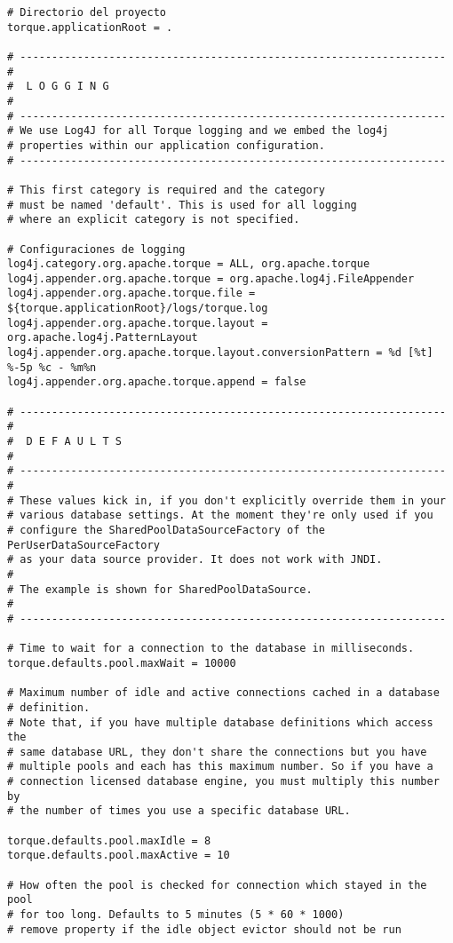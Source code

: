 \begin{lstlisting}
# Directorio del proyecto
torque.applicationRoot = .

# -------------------------------------------------------------------
#
#  L O G G I N G
#
# -------------------------------------------------------------------
# We use Log4J for all Torque logging and we embed the log4j
# properties within our application configuration.
# -------------------------------------------------------------------

# This first category is required and the category
# must be named 'default'. This is used for all logging
# where an explicit category is not specified.

# Configuraciones de logging
log4j.category.org.apache.torque = ALL, org.apache.torque
log4j.appender.org.apache.torque = org.apache.log4j.FileAppender
log4j.appender.org.apache.torque.file = ${torque.applicationRoot}/logs/torque.log
log4j.appender.org.apache.torque.layout = org.apache.log4j.PatternLayout
log4j.appender.org.apache.torque.layout.conversionPattern = %d [%t] %-5p %c - %m%n
log4j.appender.org.apache.torque.append = false

# -------------------------------------------------------------------
#
#  D E F A U L T S
#
# -------------------------------------------------------------------
#
# These values kick in, if you don't explicitly override them in your
# various database settings. At the moment they're only used if you
# configure the SharedPoolDataSourceFactory of the PerUserDataSourceFactory
# as your data source provider. It does not work with JNDI.
#
# The example is shown for SharedPoolDataSource.
#
# -------------------------------------------------------------------

# Time to wait for a connection to the database in milliseconds.
torque.defaults.pool.maxWait = 10000

# Maximum number of idle and active connections cached in a database
# definition.
# Note that, if you have multiple database definitions which access the
# same database URL, they don't share the connections but you have
# multiple pools and each has this maximum number. So if you have a
# connection licensed database engine, you must multiply this number by
# the number of times you use a specific database URL.

torque.defaults.pool.maxIdle = 8
torque.defaults.pool.maxActive = 10

# How often the pool is checked for connection which stayed in the pool
# for too long. Defaults to 5 minutes (5 * 60 * 1000)
# remove property if the idle object evictor should not be run


\end{lstlisting}
